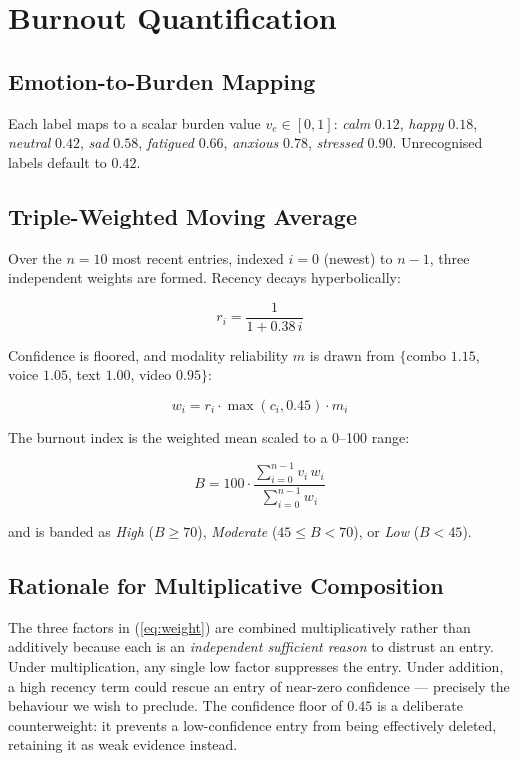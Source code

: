 \documentclass[runningheads]{llncs}
\begin{document}
\section{Burnout Quantification}
\label{sec:burnout}

\subsection{Emotion-to-Burden Mapping}
Each label maps to a scalar burden value $v_e \in [0,1]$:
\textit{calm} $0.12$, \textit{happy} $0.18$, \textit{neutral} $0.42$,
\textit{sad} $0.58$, \textit{fatigued} $0.66$, \textit{anxious} $0.78$,
\textit{stressed} $0.90$. Unrecognised labels default to $0.42$.

\subsection{Triple-Weighted Moving Average}
Over the $n = 10$ most recent entries, indexed $i = 0$ (newest) to $n-1$,
three independent weights are formed. Recency decays hyperbolically:

\begin{equation}
r_i = \frac{1}{1 + 0.38\,i}
\end{equation}

Confidence is floored, and modality reliability $m$ is drawn from
$\{$combo $1.15$, voice $1.05$, text $1.00$, video $0.95\}$:

\begin{equation}
w_i = r_i \cdot \max(c_i, 0.45) \cdot m_i
\label{eq:weight}
\end{equation}

The burnout index is the weighted mean scaled to a 0--100 range:

\begin{equation}
B = 100 \cdot \frac{\sum_{i=0}^{n-1} v_i\, w_i}{\sum_{i=0}^{n-1} w_i}
\end{equation}

and is banded as \textit{High} ($B \geq 70$), \textit{Moderate}
($45 \leq B < 70$), or \textit{Low} ($B < 45$).

\subsection{Rationale for Multiplicative Composition}
The three factors in (\ref{eq:weight}) are combined multiplicatively rather
than additively because each is an \emph{independent sufficient reason} to
distrust an entry. Under multiplication, any single low factor suppresses the
entry. Under addition, a high recency term could rescue an entry of
near-zero confidence --- precisely the behaviour we wish to preclude. The
confidence floor of $0.45$ is a deliberate counterweight: it prevents a
low-confidence entry from being effectively deleted, retaining it as weak
evidence instead.
\end{document}
